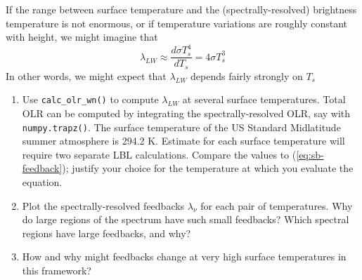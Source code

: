 \documentclass{article}
\begin{document}
If the range between surface temperature and the (spectrally-resolved) brightness temperature  is not enormous, or if temperature variations are roughly constant with height, we might  imagine that 
\begin{equation}
\label{eq:sb-feedback}
\lambda_{LW} \approx  \frac{d  \sigma T_s^4}{d T_{s}} = 4 \sigma T_s^3
\end{equation}
In other words, we might expect that $\lambda_{LW}$ depends fairly strongly on $T_s$

\begin{enumerate}
\item Use {\tt calc\_olr\_wn()} to compute $\lambda_{LW}$ at several surface temperatures. Total OLR can be computed by integrating the spectrally-resolved OLR, say with {\tt numpy.trapz()}. The surface temperature of the US Standard Midlatitude summer atmosphere is 294.2 \si{\kelvin}. Estimate for each surface temperature will require two separate LBL calculations. Compare the values to  (\ref{eq:sb-feedback}); justify your choice for the temperature at which you evaluate the equation. 
\item Plot the spectrally-resolved feedbacks $\lambda_{\nu}$ for each pair of temperatures. Why do large regions of the spectrum have such small feedbacks? Which spectral regions have large feedbacks, and why?  
\item How and why might feedbacks change at very high surface temperatures in this framework? 
\end{enumerate} 
\end{document}
